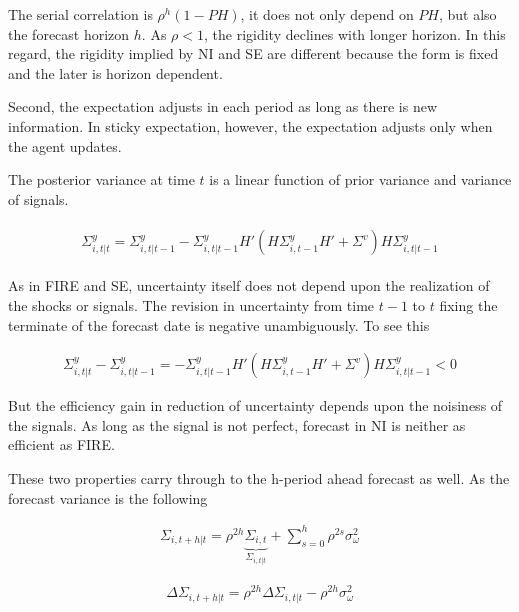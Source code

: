 \documentclass[]{article}
\begin{document}
	The serial correlation is $\rho^h(1-PH)$, it does not only depend on $PH$, but also the forecast horizon $h$. As $\rho<1$, the rigidity declines with longer horizon. In this regard, the rigidity implied by NI and SE are different because the form is fixed and the later is horizon dependent.  
	
	Second, the expectation adjusts in each period as long as there is new information. In sticky expectation, however, the expectation adjusts only when the agent updates. 
	
	
	The posterior variance at time $t$ is a linear function of prior variance and variance of signals. 
	
	\begin{eqnarray}\label{VarNIRv}
		\begin{aligned}
			\Sigma^y_{i,t|t} = \Sigma^y_{i,t|t-1} - \Sigma^y_{i,t|t-1} H'(H \Sigma^y_{i,t-1} H' +\Sigma^v) H \Sigma^y_{i,t|t-1} 
		\end{aligned}
	\end{eqnarray}
	
	
	As in FIRE and SE, uncertainty itself does not depend upon the realization of the shocks or signals. The revision in uncertainty from time $t-1$ to $t$ fixing the terminate of the forecast date is negative  unambiguously. To see this 
	
	\begin{eqnarray}
		\Sigma^y_{i,t|t} - \Sigma^y_{i,t|t-1} = - \Sigma^y_{i,t|t-1} H'(H \Sigma^y_{i,t-1} H' +\Sigma^v) H \Sigma^y_{i,t|t-1} <0
	\end{eqnarray}
	
	But the efficiency gain in reduction of uncertainty depends upon the noisiness of the signals. As long as the signal is not perfect, forecast in NI is neither as efficient as FIRE. 
	
	These two properties carry through to the h-period ahead forecast as well. As the forecast variance is the following 
	
	\begin{eqnarray}\label{VarNIEq}
		\Sigma_{i,t+h|t} = \rho^{2h} \underbrace{\Sigma_{i,t}}_{\Sigma_{i,t|t}} + \sum^{h}_{s=0}\rho^{2s} \sigma^2_{\omega}
	\end{eqnarray}
	
	
	\begin{eqnarray}\label{VarNIIndPop}
		\Delta \Sigma_{i,t+h|t} = \rho^{2h}\Delta  \Sigma_{i,t|t}  - \rho^{2h} \sigma^2_{\omega}
	\end{eqnarray}
	
\end{document}

